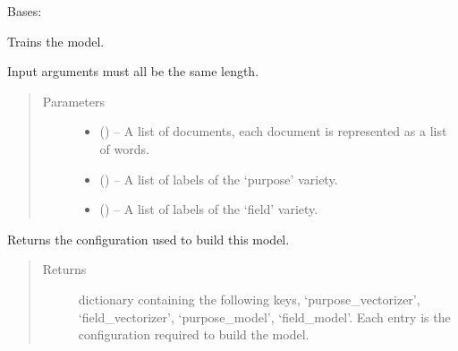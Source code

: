 \documentclass[letterpaper,10pt,english]{sphinxmanual}
\begin{document}
\begin{fulllineitems}
\label{\detokenize{KUHERD:KUHERD.Models.PurposeFieldModel}}
Bases: 

\begin{fulllineitems}
\label{\detokenize{KUHERD:KUHERD.Models.PurposeFieldModel.fit}}
Trains the model.

Input arguments must all be the same length.
\begin{quote}\begin{description}
\item[{Parameters}] \leavevmode\begin{itemize}
\item {} 
 () -- A list of documents, each document is represented as a list of words.

\item {} 
 () -- A list of labels of the `purpose' variety.

\item {} 
 () -- A list of labels of the `field' variety.

\end{itemize}

\end{description}\end{quote}

\end{fulllineitems}


\begin{fulllineitems}
\label{\detokenize{KUHERD:KUHERD.Models.PurposeFieldModel.get_config}}
Returns the configuration used to build this model.
\begin{quote}\begin{description}
\item[{Returns}] \leavevmode
dictionary containing the following keys, `purpose\_vectorizer', `field\_vectorizer', `purpose\_model', `field\_model'. Each entry is the configuration required to build the model.


\end{description}
\end{quote}
\end{fulllineitems}
\end{fulllineitems}
\end{document}

